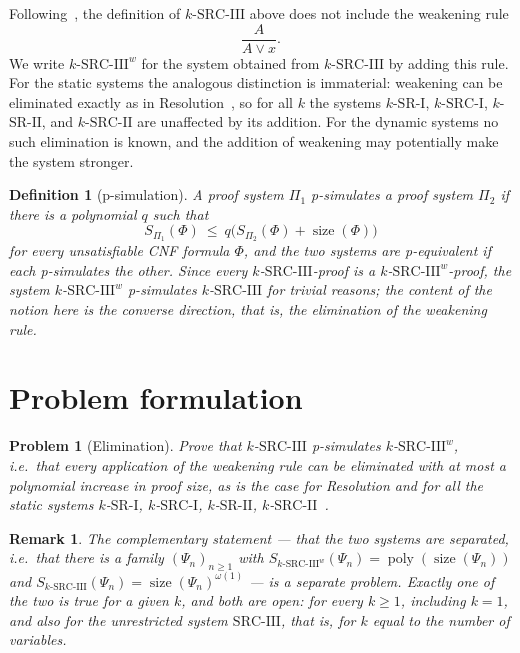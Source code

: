 \documentclass[10pt]{article}
\newtheorem{definition}{Definition}
\newtheorem{problem}{Problem}
\newtheorem{remark}[theorem]{Remark}
\newcommand{\SRI}{\text{SR-I}}
\newcommand{\SRII}{\text{SR-II}}
\newcommand{\SRCI}{\text{SRC-I}}
\newcommand{\SRCII}{\text{SRC-II}}
\newcommand{\SRCIII}{\text{SRC-III}}
\begin{document}
Following~\cite{Gaevoy26}, the definition of $k$-$\SRCIII$ above does not
include the weakening rule
\[
\frac{A}{A\lor x}.
\]
We write $k$-$\SRCIII^{w}$ for the system obtained from $k$-$\SRCIII$ by
adding this rule. For the static systems the analogous distinction is
immaterial: weakening can be eliminated exactly as in
Resolution~\cite{Szeider05}, so for all $k$ the systems $k$-$\SRI$,
$k$-$\SRCI$, $k$-$\SRII$, and $k$-$\SRCII$ are unaffected by its addition. For
the dynamic systems no such elimination is known, and the addition of
weakening may potentially make the system stronger.

\begin{definition}[p-simulation]\label{def:psim}
A proof system $\Pi_1$ \emph{p-simulates} a proof system $\Pi_2$ if there is a
polynomial $q$ such that
\[
S_{\Pi_1}(\Phi)
\ \le\
q\bigl(S_{\Pi_2}(\Phi)+\operatorname{size}(\Phi)\bigr)
\]
for every unsatisfiable CNF formula $\Phi$, and the two systems are
\emph{p-equivalent} if each p-simulates the other. Since every
$k$-$\SRCIII$-proof is a $k$-$\SRCIII^{w}$-proof, the system
$k$-$\SRCIII^{w}$ p-simulates $k$-$\SRCIII$ for trivial reasons; the content
of the notion here is the converse direction, that is, the elimination of the
weakening rule.
\end{definition}

\section{Problem formulation}

\begin{problem}[Elimination]\label{prob:elim}
Prove that $k$-$\SRCIII$ p-simulates $k$-$\SRCIII^{w}$, i.e.\ that every
application of the weakening rule can be eliminated with at most a polynomial
increase in proof size, as is the case for Resolution and for all the static
systems $k$-$\SRI$, $k$-$\SRCI$, $k$-$\SRII$, $k$-$\SRCII$~\cite{Szeider05}.
\end{problem}

\begin{remark}\label{rem:dichotomy}
The complementary statement --- that the two systems are separated, i.e.\ that
there is a family $(\Psi_n)_{n\ge 1}$ with
$S_{k\text{-}\SRCIII^{w}}(\Psi_n)=\operatorname{poly}(\operatorname{size}(\Psi_n))$
and $S_{k\text{-}\SRCIII}(\Psi_n)=\operatorname{size}(\Psi_n)^{\omega(1)}$
--- is a separate problem. Exactly one of the two
is true for a given $k$, and both are open: for every $k\ge 1$, including
$k=1$, and also for the unrestricted system $\SRCIII$, that is, for $k$ equal
to the number of variables.
\end{remark}
\end{document}

